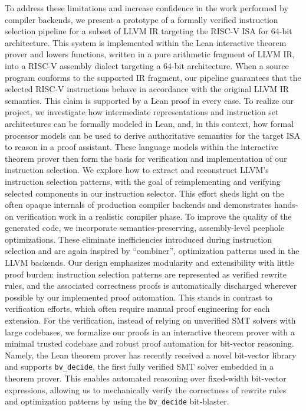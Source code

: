 \documentclass[review, anonymous, acmsmall, screen]{acmart}
\begin{document}
To address these limitations and increase confidence in the work performed by compiler backends, we 
present a prototype of a formally verified instruction selection pipeline for a subset of LLVM IR 
targeting the RISC-V ISA for 64-bit architecture. This system is implemented within the Lean interactive
theorem prover and lowers functions, written in a pure arithmetic fragment of LLVM IR, into a RISC-V
assembly dialect targeting a 64-bit architecture.  When a source program conforms to the supported
IR fragment, our pipeline guarantees that the selected RISC-V instructions behave in accordance 
with the original LLVM IR semantics. This claim is supported by a Lean proof in every case. To realize our project, we investigate how intermediate representations and instruction set 
architectures can be formally modeled in Lean, and, in this context, how formal processor models 
can be used to derive authoritative semantics for the target ISA to reason in a proof assistant. 
These language models within the interactive theorem prover then form the basis for verification and 
implementation of our instruction selection. We explore how to extract and reconstruct LLVM’s 
instruction selection patterns, with the goal of reimplementing and verifying selected components 
in our instruction selector. This effort sheds light on the often opaque internals of production 
compiler backends and demonstrates hands-on verification work in a realistic compiler phase. To 
improve the quality of the generated code, we incorporate semantics-preserving, assembly-level 
peephole optimizations. These eliminate inefficiencies introduced during instruction selection and
are again inspired by ``combiner'', optimization patterns used in the LLVM backends.\newline
Our design emphasizes modularity and extensibility with little proof burden: instruction selection 
patterns are represented as verified rewrite rules, and the associated correctness proofs is 
automatically discharged wherever possible by our implemented proof automation. This stands in 
contrast to verification efforts, which often require  manual proof engineering for each extension. 
For the verification, instead of relying on unverified SMT solvers with large codebases, we formalize
our proofs in an interactive theorem prover with a minimal trusted codebase and robust proof automation
for bit-vector reasoning.\newline
Namely, the Lean theorem prover has recently received a novel bit-vector library and 
supports \texttt{bv\_decide}, the first fully verified SMT solver embedded in a 
theorem prover. This enables automated reasoning over fixed-width bit-vector expressions, 
allowing us to mechanically verify the correctness of rewrite rules and optimization patterns by 
using the \texttt{bv\_decide} bit-blaster.
\end{document}
